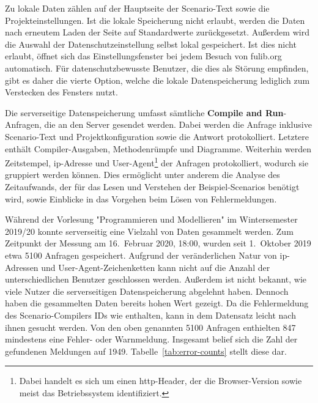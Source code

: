 Zu lokale Daten zählen auf der Hauptseite der Scenario-Text sowie die Projekteinstellungen.
Ist die lokale Speicherung nicht erlaubt, werden die Daten nach erneutem Laden der Seite auf Standardwerte zurückgesetzt.
Außerdem wird die Auswahl der Datenschutzeinstellung selbst lokal gespeichert.
Ist dies nicht erlaubt, öffnet sich das Einstellungsfenster bei jedem Besuch von fulib.org automatisch.
Für datenschutzbewusste Benutzer, die dies als Störung empfinden, gibt es daher die vierte Option, welche die lokale Datenspeicherung lediglich zum Verstecken des Fensters nutzt.

Die serverseitige Datenspeicherung umfasst sämtliche \textbf{Compile and Run}-Anfragen, die an den Server gesendet werden.
Dabei werden die Anfrage inklusive Scenario-Text und Projektkonfiguration sowie die Antwort protokolliert.
Letztere enthält Compiler-Ausgaben, Methodenrümpfe und Diagramme.
Weiterhin werden Zeitstempel, \ac{ip}-Adresse und User-Agent\footnote{Dabei handelt es sich um einen \ac{http}-Header, der die Browser-Version sowie meist das Betriebssystem identifiziert.} der Anfragen protokolliert, wodurch sie gruppiert werden können.
Dies ermöglicht unter anderem die Analyse des Zeitaufwands, der für das Lesen und Verstehen der Beispiel-Scenarios benötigt wird, sowie Einblicke in das Vorgehen beim Lösen von Fehlermeldungen.

Während der Vorlesung "Programmieren und Modellieren" im Wintersemester 2019/20 konnte serverseitig eine Vielzahl von Daten gesammelt werden.
Zum Zeitpunkt der Messung am 16.\ Februar 2020, 18:00, wurden seit 1.\ Oktober 2019 etwa 5100 Anfragen gespeichert.
Aufgrund der veränderlichen Natur von \ac{ip}-Adressen und User-Agent-Zeichenketten kann nicht auf die Anzahl der unterschiedlichen Benutzer geschlossen werden.
Außerdem ist nicht bekannt, wie viele Nutzer die serverseitigen Datenspeicherung abgelehnt haben.
Dennoch haben die gesammelten Daten bereits hohen Wert gezeigt.
Da die Fehlermeldung des Scenario-Compilers IDs wie  enthalten, kann in dem Datensatz leicht nach ihnen gesucht werden.
Von den oben genannten 5100 Anfragen enthielten 847 mindestens eine Fehler- oder Warnmeldung.
Insgesamt belief sich die Zahl der gefundenen Meldungen auf 1949.
Tabelle~\ref{tab:error-counts} stellt diese dar.

